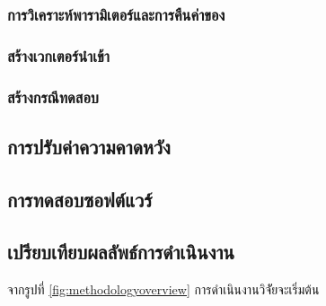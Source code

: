 \subsubsection{การวิเคราะห์พารามิเตอร์และการคืนค่าของ{\method}}
\subsubsection{สร้างเวกเตอร์นำเข้า}
\subsubsection{สร้างกรณีทดสอบ}

\subsection{การปรับค่าความคาดหวัง}

\subsection{การทดสอบซอฟต์แวร์}

\subsection{เปรียบเทียบผลลัพธ์การดำเนินงาน}

จากรูปที่ \ref{fig:methodologyoverview} การดำเนินงานวิจััยจะเริ่มต้น
